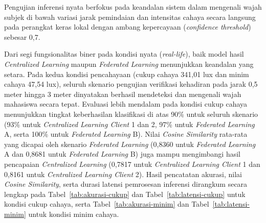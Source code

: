 \documentclass[conference]{IEEEtran}
\begin{document}
Pengujian inferensi nyata berfokus pada keandalan sistem dalam mengenali wajah subjek di bawah variasi jarak pemindaian dan intensitas cahaya secara langsung pada perangkat keras lokal dengan ambang kepercayaan (\textit{confidence threshold}) sebesar 0,7.

Dari segi fungsionalitas biner pada kondisi nyata (\textit{real-life}), baik model hasil \textit{Centralized Learning} maupun \textit{Federated Learning} menunjukkan keandalan yang setara. Pada kedua kondisi pencahayaan (cukup cahaya 341,01 lux dan minim cahaya 47,54 lux), seluruh skenario pengujian verifikasi kehadiran pada jarak 0,5 meter hingga 3 meter dinyatakan berhasil mendeteksi dan mengenali wajah mahasiswa secara tepat. Evaluasi lebih mendalam pada kondisi cukup cahaya menunjukkan tingkat keberhasilan klasifikasi di atas 90\% untuk seluruh skenario (93\% untuk \textit{Centralized Learning Client} 1 dan 2, 97\% untuk \textit{Federated Learning} A, serta 100\% untuk \textit{Federated Learning} B). Nilai \textit{Cosine Similarity} rata-rata yang dicapai oleh skenario \textit{Federated Learning} (0,8360 untuk \textit{Federated Learning} A dan 0,8681 untuk \textit{Federated Learning} B) juga mampu mengimbangi hasil pencapaian \textit{Centralized Learning} (0,7817 untuk \textit{Centralized Learning Client} 1 dan 0,8161 untuk \textit{Centralized Learning Client} 2). Hasil pencatatan akurasi, nilai \textit{Cosine Similarity}, serta durasi latensi pemrosesan inferensi dirangkum secara lengkap pada Tabel~\ref{tab:akurasi-cukup} dan Tabel~\ref{tab:latensi-cukup} untuk kondisi cukup cahaya, serta Tabel~\ref{tab:akurasi-minim} dan Tabel~\ref{tab:latensi-minim} untuk kondisi minim cahaya.

\begin{table}[H]
\caption{Hasil Pengujian Akurasi dan Kemiripan Kosinus (Cukup Cahaya: 341,01 lux)}
\begin{center}
\label{tab:akurasi-cukup}
\end{center}
\end{table}
\end{document}
